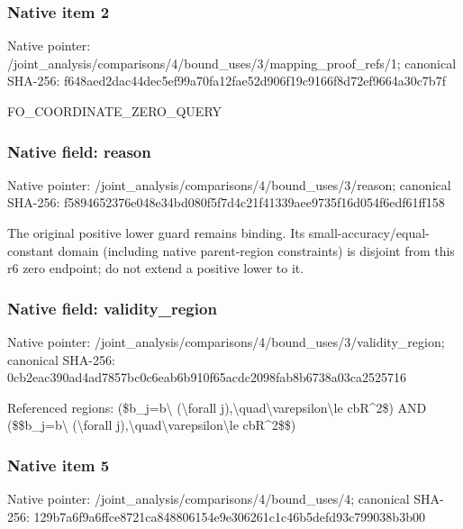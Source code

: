 \documentclass[10pt,a4paper]{article}
\begin{document}
\subsubsection{Native item 2}
Native pointer: /joint\_\allowbreak{}analysis/comparisons/4/bound\_\allowbreak{}uses/3/mapping\_\allowbreak{}proof\_\allowbreak{}refs/1; canonical SHA-256: f648aed2dac44dec5ef99a70fa12fae52d906f19c9166f8d72ef9664a30c7b7f

\begingroup\raggedright\sloppy FO\_\allowbreak{}COORDINATE\_\allowbreak{}ZERO\_\allowbreak{}QUERY\par\endgroup

\subsubsection{Native field: reason}
Native pointer: /joint\_\allowbreak{}analysis/comparisons/4/bound\_\allowbreak{}uses/3/reason; canonical SHA-256: f5894652376e048e34bd080f5f7d4c21f41339aee9735f16d054f6edf61ff158

\begingroup\raggedright\sloppy The original positive lower guard remains binding. Its small-accuracy/\allowbreak{}equal-constant domain (including native parent-region constraints) is disjoint from this r6 zero endpoint;\allowbreak{} do not extend a positive lower to it.\par\endgroup

\subsubsection{Native field: validity\_\allowbreak{}region}
Native pointer: /joint\_\allowbreak{}analysis/comparisons/4/bound\_\allowbreak{}uses/3/validity\_\allowbreak{}region; canonical SHA-256: 0cb2eac390ad4ad7857bc0c6eab6b910f65acdc2098fab8b6738a03ca2525716

\begingroup\raggedright\sloppy Referenced regions:\allowbreak{} (\$b\_\allowbreak{}j=\allowbreak{}b\textbackslash{} (\textbackslash{}forall j),\allowbreak{}\textbackslash{}quad\textbackslash{}varepsilon\textbackslash{}le cbR\textasciicircum{}2\$) AND (\$\$b\_\allowbreak{}j=\allowbreak{}b\textbackslash{} (\textbackslash{}forall j),\allowbreak{}\textbackslash{}quad\textbackslash{}varepsilon\textbackslash{}le cbR\textasciicircum{}2\$\$)\par\endgroup

\subsubsection{Native item 5}
Native pointer: /joint\_\allowbreak{}analysis/comparisons/4/bound\_\allowbreak{}uses/4; canonical SHA-256: 129b7a6f9a6ffce8721ca848806154e9e306261c1c46b5defd93c799038b3b00
\end{document}

